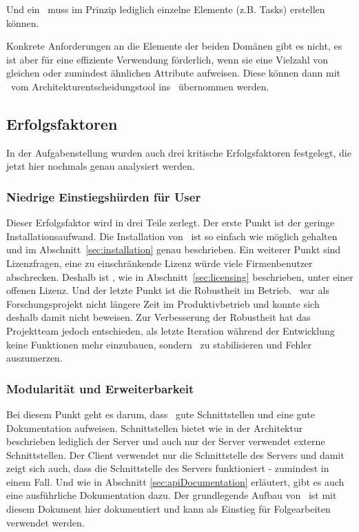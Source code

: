 			Und ein \ppt\ muss im Prinzip lediglich einzelne Elemente (z.B. Tasks) erstellen können.
			
			Konkrete Anforderungen an die Elemente der beiden Domänen gibt es nicht,
			es ist aber für eine effiziente Verwendung förderlich,
			wenn sie eine Vielzahl von gleichen oder zumindest ähnlichen Attribute aufweisen.
			Diese können dann mit \eeppi\ vom Architekturentscheidungstool ins \ppt\ übernommen werden.

	\subsection{Erfolgsfaktoren}
		In der Aufgabenstellung wurden auch drei kritische Erfolgsfaktoren festgelegt,
		die jetzt hier nochmals genau analysiert werden.
		
		\subsubsection{Niedrige Einstiegshürden für User}
			Dieser Erfolgsfaktor wird in drei Teile zerlegt.
			Der erste Punkt ist der geringe Installationsaufwand.
			Die Installation von \eeppi\ ist so einfach wie möglich gehalten und im Abschnitt\ \ref{sec:installation} genau beschrieben.
			Ein weiterer Punkt sind Lizenzfragen,
			eine zu einschränkende Lizenz würde viele Firmenbenutzer abschrecken.
			Deshalb ist \eeppi, wie in Abschnitt\ \ref{sec:licensing} beschrieben, unter einer offenen Lizenz.
			Und der letzte Punkt ist die Robustheit im Betrieb.
			\eeppi\ war als Forschungsprojekt nicht längere Zeit im Produktivbetrieb
			und konnte sich deshalb damit nicht beweisen.
			Zur Verbesserung der Robustheit hat das Projektteam jedoch entschieden,
			als letzte Iteration während der Entwicklung keine Funktionen mehr einzubauen,
			sondern \eeppi\ zu stabilisieren und Fehler auszumerzen.
		
		\subsubsection{Modularität und Erweiterbarkeit}
			Bei diesem Punkt geht es darum, dass \eeppi\ gute Schnittstellen und eine gute Dokumentation aufweisen.
			Schnittstellen bietet wie in der Architektur beschrieben lediglich der Server
			und auch nur der Server verwendet externe Schnittstellen.
			Der Client verwendet nur die Schnittstelle des Servers
			und damit zeigt sich auch, dass die Schnittstelle des Servers funktioniert - zumindest in einem Fall.
			Und wie in Abschnitt \ref{sec:apiDocumentation} erläutert, gibt es auch eine ausführliche Dokumentation dazu.
			Der grundlegende Aufbau von \eeppi\ ist mit diesem Dokument hier dokumentiert
			und kann als Einstieg für Folgearbeiten verwendet werden.
			
